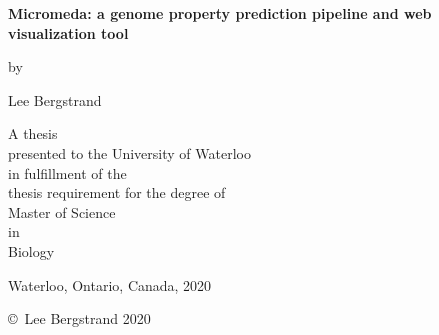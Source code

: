 \pagestyle{empty}

\begin{titlepage}
        \begin{center}
        \vspace*{1.0cm}

        \Huge
        {\bf Micromeda: a genome property prediction pipeline and web visualization tool}

        \vspace*{1.0cm}

        \normalsize
        by \\

        \vspace*{1.0cm}

        \Large
        Lee Bergstrand \\

        \vspace*{3.0cm}

        \normalsize
        A thesis \\
        presented to the University of Waterloo \\ 
        in fulfillment of the \\
        thesis requirement for the degree of \\
        Master of Science \\
        in \\
        Biology \\

        \vspace*{2.0cm}

        Waterloo, Ontario, Canada, 2020 \\

        \vspace*{1.0cm}

        \copyright\ Lee Bergstrand 2020 \\
        \end{center}
\end{titlepage}

\pagestyle{plain}
\setcounter{page}{2}

